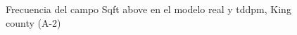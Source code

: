 \begin{figure}[H]
    \centering
    
    \caption{Frecuencia del campo Sqft above en el modelo real y tddpm, King county (A-2)}
    \label{frecuency-tddpm-sqft above}
\end{figure}